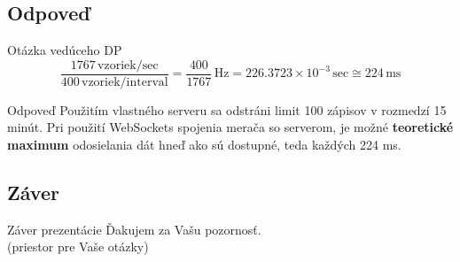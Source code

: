 \documentclass[hyperref={unicode}]{beamer}
\begin{document}
\subsection{Odpoveď}
\label{sub:Odpoveď}

\begin{frame}{Otázka vedúceho DP}
	\begin{equation*}
		\frac{1767\,\text{vzoriek/sec}}{400\,\text{vzoriek/interval}} = \frac{400}{1767}\,\text{Hz} = 226.3723\times 10^{-3}\,\text{sec}\cong 224\,\text{ms}
	\end{equation*}

	\begin{block}{Odpoveď}
		Použitím vlastného serveru sa odstráni limit 100 zápisov v rozmedzí 15 minút. Pri použití WebSockets spojenia merača so serverom, je možné \textbf{teoretické maximum} odosielania dát hneď ako sú dostupné, teda každých 224 ms.
	\end{block}
\end{frame}



\subsection{Záver}
\label{sub:Záver}

\begin{frame}{Záver prezentácie}
	\centering
	{\Large Ďakujem za Vašu pozornosť.\\
	\vspace{1cm}
	(priestor pre Vaše otázky)}
\end{frame}
\end{document}

